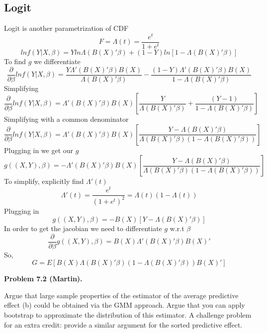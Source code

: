 \documentclass[11pt]{article}
\newenvironment{problem}[1]
    {\bigskip\noindent\textbf{Problem #1.}\par\setlength{\parindent}{0pt}}
    {\medskip}
\begin{document}
\subsection*{Logit}
Logit is another parametrization of CDF
\[F = \Lambda(t) = \frac{e^t}{1+e^t}\]
\[lnf(Y|X,\beta) = Yln \Lambda(B(X)'\beta) + (1-Y)ln[1-\Lambda(B(X)'\beta)]\]
To find $g$ we differentiate
\[\frac{\partial }{\partial \beta} ln f(Y|X,\beta) = \frac{Y \Lambda'(B(X)'\beta) B(X)}{\Lambda(B(X)'\beta)} - \frac{(1-Y)\Lambda'(B(X)'\beta)B(X)}{1-\Lambda(B(X)'\beta)}\]
Simplifying
\[\frac{\partial }{\partial \beta} ln f(Y|X,\beta) = \Lambda'(B(X)'\beta)B(X)\left[\frac{Y}{\Lambda(B(X)'\beta)} + \frac{(Y-1)}{1-\Lambda(B(X)'\beta)}\right]\]
Simplifying with a common denominator
\[\frac{\partial }{\partial \beta} ln f(Y|X,\beta) = \Lambda'(B(X)'\beta)B(X)\left[\frac{Y - \Lambda(B(X)'\beta)}{\Lambda(B(X)'\beta) (1-\Lambda(B(X)'\beta))}\right]\]
Plugging in we get our $g$
\[g((X,Y),\beta) = -\Lambda'(B(X)'\beta)B(X)\left[\frac{Y - \Lambda(B(X)'\beta)}{\Lambda(B(X)'\beta) (1-\Lambda(B(X)'\beta))}\right]\]
To simplify, explicitly find $\Lambda'(t)$
\[\Lambda'(t) = \frac{e^t}{(1+e^t)^2} = \Lambda(t)(1-\Lambda(t))\]
Plugging in 
\[g((X,Y),\beta) = -B(X)\left[Y - \Lambda(B(X)'\beta)\right]\]
In order to get the jacobian we need to differentiate $g$ w.r.t $\beta$
\[\frac{\partial}{\partial \beta}g((X,Y), \beta) = B(X)\Lambda'(B(X)'\beta)B(X)'\]
So, 
\[G= E\left[B(X)\Lambda\left(B(X)'\beta\right)\left(1-\Lambda\left(B(X)'\beta\right)\right)B(X)'\right]\]





\newpage
\begin{problem}{7.2 (Martin)} 
Argue that large sample properties of the estimator of the average predictive effect (b) could be obtained via the GMM approach. Argue that you can apply bootstrap to approximate the distribution of this estimator. A challenge problem for an extra credit: provide a similar argument for the sorted predictive effect.
\end{problem}
\end{document}
